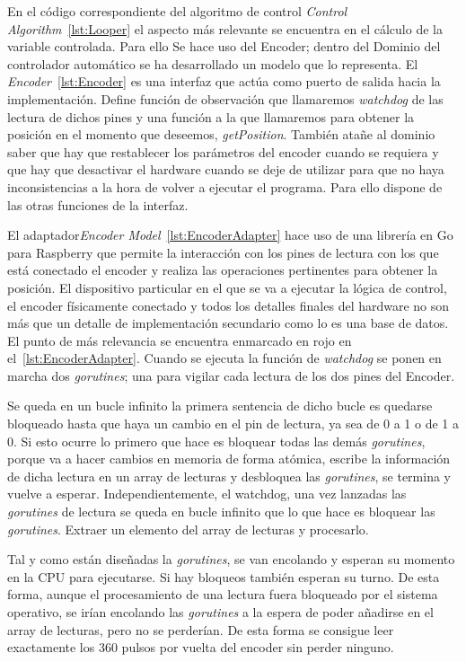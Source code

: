 
En el código correspondiente del algoritmo de control \textit{Control Algorithm}~\cref{lst:Looper} el aspecto más relevante se encuentra en el cálculo de la variable controlada.
Para ello Se hace uso del Encoder; dentro del Dominio del controlador automático se ha desarrollado un modelo que lo representa.
El \textit{Encoder}~\cref{lst:Encoder} es una interfaz que actúa como puerto de salida hacia la implementación.
Define función de observación que llamaremos \textit{watchdog} de las lectura de dichos pines y una función a la que llamaremos para obtener la posición en el momento que deseemos, \textit{getPosition}.
También atañe al dominio saber que hay que restablecer los parámetros del encoder cuando se requiera y que hay que desactivar el hardware cuando se deje de utilizar para que no haya inconsistencias a la hora de volver a ejecutar el programa.
Para ello dispone de las otras funciones de la interfaz.

El adaptador\textit{Encoder Model}~\cref{lst:EncoderAdapter} hace uso de una librería en Go para Raspberry que permite la interacción con los pines de lectura con los que está conectado el encoder y realiza las operaciones pertinentes para obtener la posición.
El dispositivo particular en el que se va a ejecutar la lógica de control, el encoder físicamente conectado y todos los detalles finales del hardware no son más que un detalle de implementación secundario como lo es una base de datos.
El punto de más relevancia se encuentra enmarcado en rojo en el~\cref{lst:EncoderAdapter}.
Cuando se ejecuta la función de \textit{watchdog} se ponen en marcha dos \textit{gorutines}; una para vigilar cada lectura de los dos pines del Encoder.

Se queda en un bucle infinito la primera sentencia de dicho bucle es quedarse bloqueado hasta que haya un cambio en el pin de lectura, ya sea de 0 a 1 o de 1 a 0.
Si esto ocurre lo primero que hace es bloquear todas las demás \textit{gorutines}, porque va a hacer cambios en memoria de forma atómica, escribe la información de dicha lectura en un array de lecturas y desbloquea las \textit{gorutines}, se termina y vuelve a esperar.
Independientemente, el watchdog, una vez lanzadas las \textit{gorutines} de lectura se queda en bucle infinito que lo que hace es bloquear las \textit{gorutines}.
Extraer un elemento del array de lecturas y procesarlo.

Tal y como están diseñadas la \textit{gorutines}, se van encolando y esperan su momento en la CPU para ejecutarse.
Si hay bloqueos también esperan su turno.
De esta forma, aunque el procesamiento de una lectura fuera bloqueado por el sistema operativo, se irían encolando las \textit{gorutines} a la espera de poder añadirse en el array de lecturas, pero no se perderían.
De esta forma se consigue leer exactamente los 360 pulsos por vuelta del encoder sin perder ninguno.



